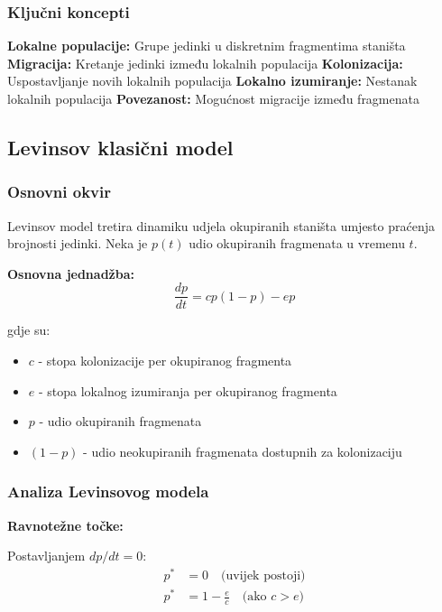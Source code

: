 \documentclass[11pt,oneside]{book}
\begin{document}
\subsubsection{Ključni koncepti}

\textbf{Lokalne populacije:} Grupe jedinki u diskretnim fragmentima staništa
\textbf{Migracija:} Kretanje jedinki između lokalnih populacija
\textbf{Kolonizacija:} Uspostavljanje novih lokalnih populacija
\textbf{Lokalno izumiranje:} Nestanak lokalnih populacija
\textbf{Povezanost:} Mogućnost migracije između fragmenata

\subsection{Levinsov klasični model}

\subsubsection{Osnovni okvir}

Levinsov model tretira dinamiku udjela okupiranih staništa umjesto praćenja brojnosti jedinki. Neka je $p(t)$ udio okupiranih fragmenata u vremenu $t$.

\textbf{Osnovna jednadžba:}
\begin{equation}
	\frac{dp}{dt} = cp(1-p) - ep
\end{equation}

gdje su:
\begin{itemize}
	\item $c$ - stopa kolonizacije per okupiranog fragmenta
	\item $e$ - stopa lokalnog izumiranja per okupiranog fragmenta
	\item $p$ - udio okupiranih fragmenata
	\item $(1-p)$ - udio neokupiranih fragmenata dostupnih za kolonizaciju
\end{itemize}

\subsubsection{Analiza Levinsovog modela}

\textbf{Ravnotežne točke:}

Postavljanjem $dp/dt = 0$:
\begin{align}
	p^* &= 0 \quad \text{(uvijek postoji)} \\
	p^* &= 1 - \frac{e}{c} \quad \text{(ako } c > e\text{)}
\end{align}
\end{document}
